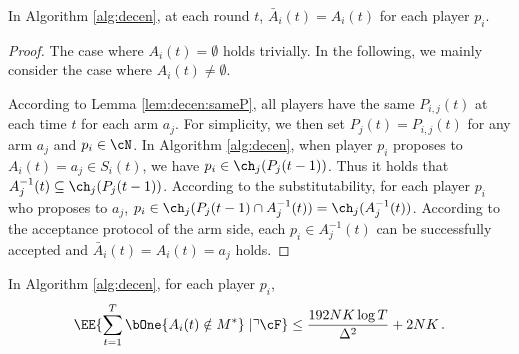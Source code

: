 \begin{lemma}\label{lem:decen:nocollision}
In Algorithm \ref{alg:decen}, at each round $t$, $\bar{A}_i(t) = A_i(t)$ for each player $p_i$. 
\end{lemma} 
\begin{proof}
The case where $A_i(t) = \emptyset$ holds trivially. In the following, we mainly consider the case where $A_i(t) \neq \emptyset$. 

According to Lemma \ref{lem:decen:sameP}, all players have the same $P_{i,j}(t)$ at each time $t$ for each arm $a_j$. For simplicity, we then set $P_j(t) = P_{i,j}(t)$ for any arm $a_j$ and $p_i \in \cN$. In Algorithm \ref{alg:decen}, when player $p_i$ proposes to $A_i(t) =a_j \in S_i(t)$, we have $p_i \in \ch_j(P_j(t-1))$. 
Thus it holds that $A^{-1}_j(t)\subseteq \ch_j(P_j(t-1))$. 
According to the substitutability, for each player $p_i$ who proposes to $a_j$, $p_i \in \ch_j(P_j(t-1)\cap A^{-1}_j(t)) = \ch_j(A^{-1}_j(t))$. According to the acceptance protocol of the arm side, each $p_i \in A^{-1}_j(t)$ can be successfully accepted and $\bar{A}_i(t)=A_i(t)=a_j$ holds. 
\end{proof}











\begin{lemma}\label{lem:decen:mainevent}
In Algorithm \ref{alg:decen}, for each player $p_i$, 
\begin{align*}
\EE{\sum_{t=1}^T \bOne{{A}_i(t) \notin M^*}\mid \urcorner \cF } \le \frac{192NK\log T}{\Delta^2} + 2NK \,.
\end{align*}
\end{lemma}


